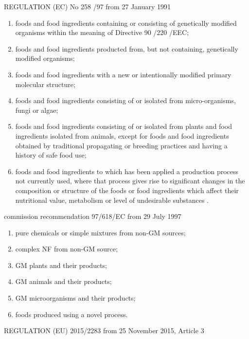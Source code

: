 \documentclass[12pt]{article}
\begin{document}
REGULATION (EC) No 258 /97 from 27 January 1991

\begin{enumerate}[label=(\alph*)]
    \item foods and food ingredients containing or consisting of genetically modified organisms within the meaning of Directive 90 /220 /EEC;
    \item foods and food ingredients producted from, but not containing, genetically modified organisms;
    \item foods and food ingredients with a new or intentionally modified primary molecular structure;
    \item foods and food ingredients consisting of or isolated from micro-organisms, fungi or algae;
    \item foods and food ingredients consisting of or isolated from plants and food ingredients isolated from animals, except for foods and food ingredients obtained by traditional propagating or breeding prac­tices and having a history of safe food use;
    \item foods and food ingredients to which has been applied a production process not currently used, where that process gives rise to significant changes in the com­position or structure of the foods or food ingredients which affect their nutritional value, metabolism or level of undesirable substances .
\end{enumerate}

commission recommendation 97/618/EC from 29 July 1997

\begin{enumerate}[label=(\alph*)]
    \item pure chemicals or simple mixtures from non-GM sources;
    \item complex NF from non-GM source;
    \item GM plants and their products;
    \item GM animals and their products;
    \item GM microorganisms and their products;
    \item foods produced using a novel process.
\end{enumerate}

REGULATION (EU) 2015/2283 from 25 November 2015, Article 3
\end{document}
